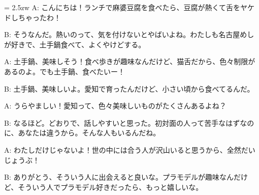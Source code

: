 \documentclass[11pt]{amsart}
\title{}
\author{}
\newenvironment{hangall}[1]{\hangindent = 2.5zw\everypar{\hangindent = 2.5zw}}{}
\begin{document}
\maketitle
\begin{hangall}{}%
A: こんにちは！ランチで麻婆豆腐を食べたら、豆腐が熱くて舌をヤケドしちゃったわ！



B: そうなんだ。熱いのって、気を付けないとやばいよね。わたしも名古屋めしが好きで、土手鍋食べて、よくやけどする。



A: 土手鍋、美味しそう！食べ歩きが趣味なんだけど、猫舌だから、色々制限があるのよ。でも土手鍋、食べたいー！



B: 土手鍋、美味しいよ。愛知で育ったんだけど、小さい頃から食べてるんだ。



A: うらやましい！愛知って、色々美味しいものがたくさんあるよね？



B: なるほど。どおりで、話しやすいと思った。初対面の人って苦手なはずなのに、あなたは違うから。そんな人もいるんだね。



A: わたしだけじゃないよ！世の中には合う人が沢山いると思うから、全然だいじょうぶ！



B: ありがとう、そういう人に出会えると良いな。プラモデルが趣味なんだけど、そういう人でプラモデル好きだったら、もっと嬉しいな。\end{hangall}
\end{document}
